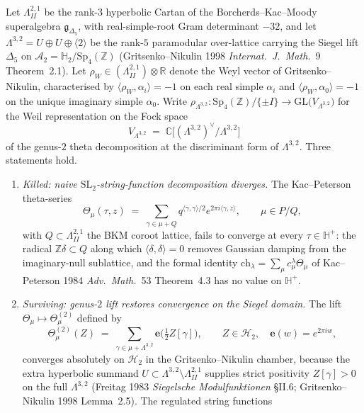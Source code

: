 \begin{proposition}
\label{prop:k3ca-string-functions-genus2-weil-rep}
Let $\Lambda^{2,1}_{II}$ be the rank-$3$ hyperbolic Cartan of the Borcherds--Kac--Moody superalgebra $\mathfrak g_{\Delta_5}$, with real-simple-root Gram determinant $-32$, and let $\Lambda^{3,2}=U\oplus U\oplus\langle 2\rangle$ be the rank-$5$ paramodular over-lattice carrying the Siegel lift $\Delta_5$ on $\mathcal A_2=\mathbb H_2/\mathrm{Sp}_4(\mathbb Z)$ (Gritsenko--Nikulin 1998 \emph{Internat.\ J.\ Math.}~9 Theorem~2.1). Let $\rho_W\in(\Lambda^{2,1}_{II})\otimes\mathbb R$ denote the Weyl vector of Gritsenko--Nikulin, characterised by $\langle\rho_W,\alpha_i\rangle=-1$ on each real simple $\alpha_i$ and $\langle\rho_W,\alpha_0\rangle=-1$ on the unique imaginary simple $\alpha_0$. Write $\rho_{\Lambda^{3,2}}:\mathrm{Sp}_4(\mathbb Z)/\{\pm I\}\to\mathrm{GL}\!\bigl(V_{\Lambda^{3,2}}\bigr)$ for the Weil representation on the Fock space
\[
 V_{\Lambda^{3,2}}\;=\;\mathbb C\!\bigl[(\Lambda^{3,2})^\vee/\Lambda^{3,2}\bigr]
\]
of the genus-$2$ theta decomposition at the discriminant form of $\Lambda^{3,2}$. Three statements hold.
\begin{enumerate}[label=\textup{(\roman*)}]
\item \emph{Killed: naive $\mathrm{SL}_2$-string-function decomposition diverges.} The Kac--Peterson theta-series
\[
 \Theta_\mu(\tau,z)\;=\;\sum_{\gamma\in\mu+Q}q^{\langle\gamma,\gamma\rangle/2}e^{2\pi i\langle\gamma,z\rangle},\qquad\mu\in P/Q,
\]
with $Q\subset\Lambda^{2,1}_{II}$ the BKM coroot lattice, fails to converge at every $\tau\in\mathbb H^+$: the radical $\mathbb Z\delta\subset Q$ along which $\langle\delta,\delta\rangle=0$ removes Gaussian damping from the imaginary-null sublattice, and the formal identity $\mathrm{ch}_\lambda=\sum_\mu c^\lambda_\mu\Theta_\mu$ of Kac--Peterson 1984 \emph{Adv.\ Math.}~53 Theorem~4.3 has no value on $\mathbb H^+$.
\item \emph{Surviving: genus-$2$ lift restores convergence on the Siegel domain.} The lift $\Theta_\mu\mapsto\Theta^{(2)}_\mu$ defined by
\[
 \Theta^{(2)}_\mu(Z)\;=\;\sum_{\gamma\in\mu+\Lambda^{3,2}}\mathbf e\!\bigl(\tfrac12 Z[\gamma]\bigr),\qquad Z\in\mathcal H_2,\quad\mathbf e(w)=e^{2\pi iw},
\]
converges absolutely on $\mathcal H_2$ in the Gritsenko--Nikulin chamber, because the extra hyperbolic summand $U\subset\Lambda^{3,2}\setminus\Lambda^{2,1}_{II}$ supplies strict positivity $Z[\gamma]>0$ on the full $\Lambda^{3,2}$ (Freitag 1983 \emph{Siegelsche Modulfunktionen} \S II.6; Gritsenko--Nikulin 1998 Lemma~2.5). The regulated string functions

\end{enumerate}
\end{proposition}
